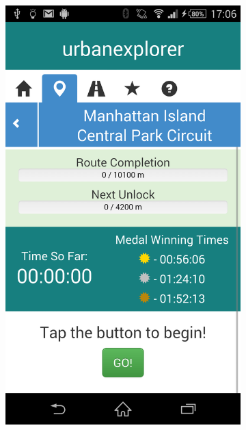 \begin{figure}[h]
\begin{subfigure}[b]{0.3\textwidth}
    \includegraphics[width=\textwidth]{images/screens/route.png}
  \end{subfigure}
  \hspace{0.02\textwidth}
  \begin{subfigure}[b]{0.3\textwidth}

\end{subfigure}
\end{figure}
